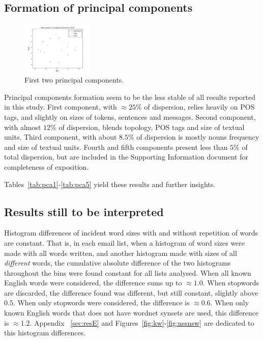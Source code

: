 \subsection{Formation of principal components}\label{subsec:pc}

\begin{figure}[!h]
	\centering
	\includegraphics[width=0.3\textwidth]{figs/plot_pca}
	\caption{First two principal components.}
	\label{fig:formation}
\end{figure}



Principal components formation seem to be the less stable of all results reported in this study.
First component, with $\approx 25\%$ of dispersion, relies heavily on POS tags,
and slightly on sizes of tokens, sentences and messages.
Second component, with almost $12\%$ of dispersion, blends topology, POS tags and size of textual units.
Third component, with about $8.5\%$ of dispersion is mostly nouns frequency and size of textual units.
Fourth and fifth components present less than $5\%$ of total dispersion,
but are included in the Supporting Information document for completeness of exposition.

Tables~\ref{tab:pca1}-\ref{tab:pca5} yield these results and further insights.

\subsection{Results still to be interpreted}\label{subsec:sii}
Histogram differences of incident word sizes with and without repetition of words are constant.
That is, in each email list, when a histogram of word sizes were made with all words written,
and another histogram made with sizes of all \emph{different} words,
the cumulative absolute difference of the two histograms throughout the bins were found constant for all lists analysed.
When all known English words were considered, 
the difference sums up to $\approx 1.0$.
When stopwords are discarded,
the difference found was different, but still constant, slightly above $0.5$.
When only stopwords were considered, the difference is $\approx 0.6$.
When only known English words that does not have wordnet synsets are used,
this difference is $\approx 1.2$.
Appendix ~\ref{sec:resE} and Figures~\ref{fig:kw}-\ref{fig:nssnsw} are dedicated to this histogram differences.

